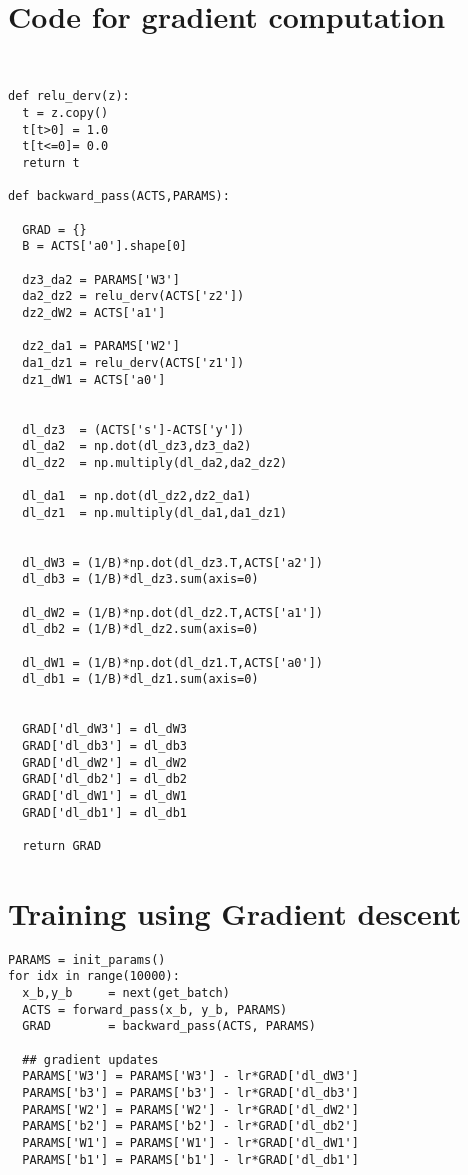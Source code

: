 \documentclass[10pt]{article}
\begin{document}
\section{Code for gradient computation}
\begin{verbatim}


def relu_derv(z):
  t = z.copy()
  t[t>0] = 1.0
  t[t<=0]= 0.0
  return t

def backward_pass(ACTS,PARAMS):
  
  GRAD = {}
  B = ACTS['a0'].shape[0]
  
  dz3_da2 = PARAMS['W3']
  da2_dz2 = relu_derv(ACTS['z2'])
  dz2_dW2 = ACTS['a1']
  
  dz2_da1 = PARAMS['W2']
  da1_dz1 = relu_derv(ACTS['z1'])
  dz1_dW1 = ACTS['a0']
  
   
  dl_dz3  = (ACTS['s']-ACTS['y'])
  dl_da2  = np.dot(dl_dz3,dz3_da2)
  dl_dz2  = np.multiply(dl_da2,da2_dz2)
  
  dl_da1  = np.dot(dl_dz2,dz2_da1)
  dl_dz1  = np.multiply(dl_da1,da1_dz1)
  
  
  dl_dW3 = (1/B)*np.dot(dl_dz3.T,ACTS['a2'])
  dl_db3 = (1/B)*dl_dz3.sum(axis=0)
  
  dl_dW2 = (1/B)*np.dot(dl_dz2.T,ACTS['a1'])
  dl_db2 = (1/B)*dl_dz2.sum(axis=0)
  
  dl_dW1 = (1/B)*np.dot(dl_dz1.T,ACTS['a0'])
  dl_db1 = (1/B)*dl_dz1.sum(axis=0)
  

  GRAD['dl_dW3'] = dl_dW3
  GRAD['dl_db3'] = dl_db3
  GRAD['dl_dW2'] = dl_dW2
  GRAD['dl_db2'] = dl_db2
  GRAD['dl_dW1'] = dl_dW1
  GRAD['dl_db1'] = dl_db1
  
  return GRAD
\end{verbatim}

\section{Training using Gradient descent}
\begin{verbatim}
PARAMS = init_params()
for idx in range(10000):
  x_b,y_b     = next(get_batch)
  ACTS = forward_pass(x_b, y_b, PARAMS)
  GRAD        = backward_pass(ACTS, PARAMS)

  ## gradient updates  
  PARAMS['W3'] = PARAMS['W3'] - lr*GRAD['dl_dW3']
  PARAMS['b3'] = PARAMS['b3'] - lr*GRAD['dl_db3']
  PARAMS['W2'] = PARAMS['W2'] - lr*GRAD['dl_dW2']
  PARAMS['b2'] = PARAMS['b2'] - lr*GRAD['dl_db2']
  PARAMS['W1'] = PARAMS['W1'] - lr*GRAD['dl_dW1']
  PARAMS['b1'] = PARAMS['b1'] - lr*GRAD['dl_db1']
\end{verbatim}
\end{document}
